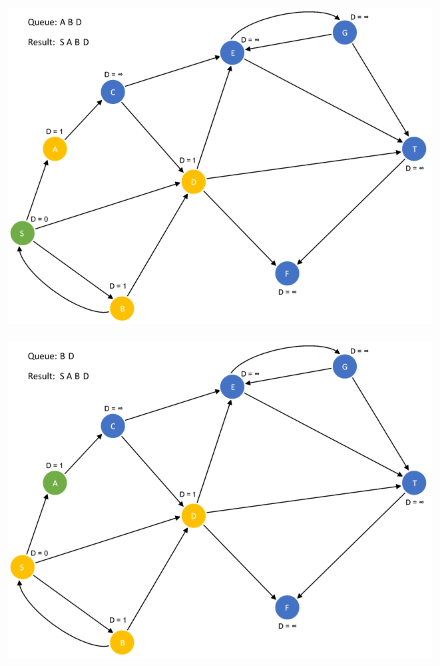 \documentclass{article}
\begin{document}
\begin{figure}[H]
\centering
\includegraphics[scale=0.6]{images/Q4/04.png}
\end{figure}

\begin{figure}[H]
\centering
\includegraphics[scale=0.6]{images/Q4/05.png}
\end{figure}
\end{document}
